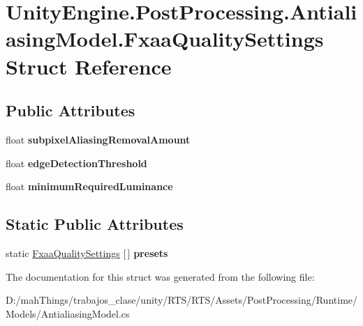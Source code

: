 \hypertarget{struct_unity_engine_1_1_post_processing_1_1_antialiasing_model_1_1_fxaa_quality_settings}{}\section{Unity\+Engine.\+Post\+Processing.\+Antialiasing\+Model.\+Fxaa\+Quality\+Settings Struct Reference}
\label{struct_unity_engine_1_1_post_processing_1_1_antialiasing_model_1_1_fxaa_quality_settings}
\subsection*{Public Attributes}
\begin{DoxyCompactItemize}
\item 
\mbox{\label{struct_unity_engine_1_1_post_processing_1_1_antialiasing_model_1_1_fxaa_quality_settings_ac514fdce358d2574ff6077c396d6f21e}} 
float {\bfseries subpixel\+Aliasing\+Removal\+Amount}
\item 
\mbox{\label{struct_unity_engine_1_1_post_processing_1_1_antialiasing_model_1_1_fxaa_quality_settings_acdbd8b0638ef670b1cf306486c37224c}} 
float {\bfseries edge\+Detection\+Threshold}
\item 
\mbox{\label{struct_unity_engine_1_1_post_processing_1_1_antialiasing_model_1_1_fxaa_quality_settings_a9d0a9883141d960b0e9e84aa08d4f287}} 
float {\bfseries minimum\+Required\+Luminance}
\end{DoxyCompactItemize}
\subsection*{Static Public Attributes}
\begin{DoxyCompactItemize}
\item 
\mbox{\label{struct_unity_engine_1_1_post_processing_1_1_antialiasing_model_1_1_fxaa_quality_settings_aa0de93d00805e6023393a52a6434a3b6}} 
static \mbox{\hyperlink{struct_unity_engine_1_1_post_processing_1_1_antialiasing_model_1_1_fxaa_quality_settings}{Fxaa\+Quality\+Settings}} \mbox{[}$\,$\mbox{]} {\bfseries presets}
\end{DoxyCompactItemize}


The documentation for this struct was generated from the following file\+:\begin{DoxyCompactItemize}
\item 
D\+:/mah\+Things/trabajos\+\_\+clase/unity/\+R\+T\+S/\+R\+T\+S/\+Assets/\+Post\+Processing/\+Runtime/\+Models/Antialiasing\+Model.\+cs\end{DoxyCompactItemize}
